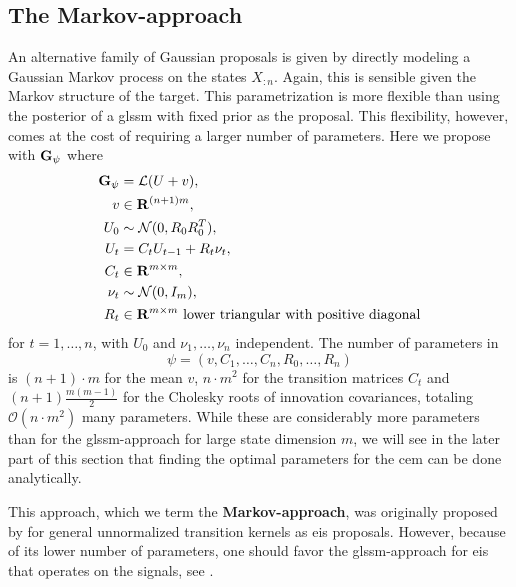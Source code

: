 \subsection{The Markov-approach}
\label{subsec:markov-approach}
An alternative family of Gaussian proposals is given by directly modeling a Gaussian Markov process on the states $X_{:n}$. Again, this is sensible given the Markov structure of the target. This parametrization is more flexible than using the posterior of a \gls{glssm} with fixed prior as the proposal. This flexibility, however, comes at the cost of requiring a larger number of parameters. Here we propose with $\mathbf G_{\psi}$ where
\begin{align}
    \begin{split}
    \label{eq:markov-proposal}
    \mathbf G_{\psi} &= \mathcal L (U + v), \\
    v &\in \mathbf R^{(n + 1)m}, \\
    U_{0} &\sim \mathcal N(0, R_{0}R_{0}^T),\\
    U_{t} &= C_{t}U_{t - 1} + R_{t}\nu_{t}, \\
    C_{t} &\in \mathbf R^{m\times m},\\
    \nu_{t} &\sim \mathcal N(0,I_{m}), \\
    R_{t}&\in\mathbf R^{m \times m} \text{ lower triangular with positive diagonal}
    \end{split}
\end{align}
for $t = 1, \dots, n$, with $U_{0}$ and $\nu_{1}, \dots, \nu_{n}$ independent. The number of parameters in $$\psi= \left( v, C_{1}, \dots, C_{n}, R_{0}, \dots, R_{n} \right)$$ is $(n + 1)\cdot m$ for the mean $v$, $n \cdot m^{2}$ for the transition matrices $C_{t}$ and $(n + 1) \frac{m (m - 1)}{2}$ for the Cholesky roots of innovation covariances, totaling $\mathcal O(n\cdot m^{2})$ many parameters. 
While these are considerably more parameters than for the \gls{glssm}-approach for large state dimension $m$, we will see in the later part of this section that finding the optimal parameters for the \gls{cem} can be done analytically. 

This approach, which we term the \textbf{Markov-approach}, was originally proposed by \citep{Richard2007Efficient} for general unnormalized transition kernels as \gls{eis} proposals. However, because of its lower number of parameters, one should favor the \gls{glssm}-approach for \gls{eis} that operates on the signals, see \citep{Koopman2019Modified}.

